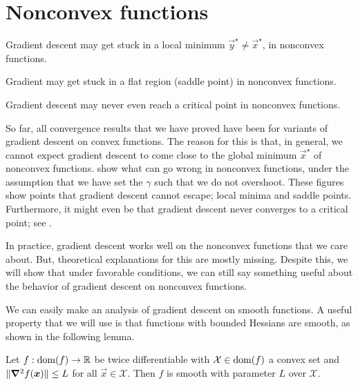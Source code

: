 \section{Nonconvex functions}

\begin{marginfigure}
    \centering
    \caption{Gradient descent may get stuck in a local minimum $\vec{y}^\star \neq \vec{x}^\star$, in nonconvex functions.}
    \label{fig:local-minimum}
\end{marginfigure}

\begin{marginfigure}
    \centering
    \caption{Gradient may get stuck in a flat region (saddle point) in nonconvex functions.}
    \label{fig:saddle-point}
\end{marginfigure}

\begin{marginfigure}
    \centering
    \caption{Gradient descent may never even reach a critical point in nonconvex functions.}
    \label{fig:no-critical-point}
\end{marginfigure}

So far, all convergence results that we have proved have been for variants of gradient descent on
convex functions. The reason for this is that, in general, we cannot expect gradient descent to
come close to the global minimum $\vec{x}^\star$ of nonconvex functions.
 show what can go wrong in nonconvex
functions, under the assumption that we have set the $\gamma$ such that we do not overshoot. These
figures show points that gradient descent cannot escape; local minima and saddle points.
Furthermore, it might even be that gradient descent never converges to a critical point; see
.

In practice, gradient descent works well on the nonconvex functions that we care about. But,
theoretical explanations for this are mostly missing. Despite this, we will show that under
favorable conditions, we can still say something useful about the behavior of gradient descent on
nonconvex functions.

We can easily make an analysis of gradient descent on smooth functions. A useful property that we
will use is that functions with bounded Hessians are smooth, as shown in the following lemma.

\begin{lemma}
    Let $f: \mathrm{dom}(f) \to \mathbb{R}$ be twice differentiable with $\mathcal{X} \in \mathrm{dom}(f)$ a convex set and
    $\| \bm{\nabla}^2_{\! } f(\bm{x}) \| \leq L$ for all $\vec{x} \in \mathcal{X}$. Then $f$ is smooth with
    parameter $L$ over $\mathcal{X}$.
\end{lemma}

